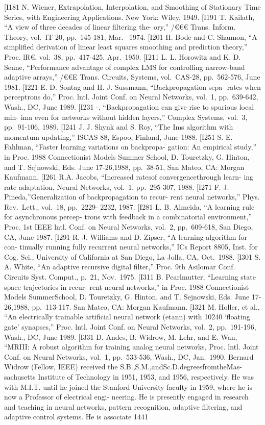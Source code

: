 {[}I181 N. Wiener, Extrapolation, Interpolation, and Smoothing of
Stationary Time Series, with Engineering Applications. New York: Wiley,
1949. {[}I191 T. Kailath, ``A view of three decades of linear filtering
the- ory,'' /€€€ Trans. Inform. Theory, vol.~IT-20, pp.~145-181, Mar.~
1974. {[}I201 H. Bode and C. Shannon, ``A simplified derivation of
linear least squares smoothing and prediction theory,'' Proc. lR€,
vol.~38, pp.~417-425, Apr.~1950. {[}I211 L. L. Horowitz and K. D. Senne,
``Performance advantage of complex LMS for controlling narrow-band
adaptive arrays,'' /€€E Trans. Circuits, Systems, vol.~CAS-28,
pp.~562-576, June 1981. {[}I221 E. D. Sontag and H. J. Sussmann,
``Backpropagation sepa- rates when perceptrons do,'' Proc. lntl. Joint
Conf. on Neural Networks, vol.~1, pp.~639-642, Wash., DC, June 1989.
{[}I231 -, ``Backpropagation can give rise to spurious local min- ima
even for networks without hidden layers,'' Complex Systems, vol.~3,
pp.~91-106, 1989. {[}I241 J. J. Shynk and S. Roy, ``The Ims algorithm
with momentum updating,'' lSCAS 88, Espoo, Finland, June 1988. {[}I251
S. E. Fahlman, ``Faster learning variations on backpropa- gation: An
empirical study,'' in Proc. 1988 Connectionist Models Summer School, D.
Touretzky, G. Hinton, and T. Sejnowski, Eds. June 17-26,1988, pp.~38-51,
San Mateo, CA: Morgan Kaufmann. {[}I261 R.A. Jacobs, ``Increased ratesof
convergencethrough learn- ing rate adaptation, Neural Networks, vol.~1,
pp.~295-307, 1988. {[}I271 F. J. Pineda,''Generalization of
backpropagation to recur- rent neural networks,'' Phys. Rev.~Lett.,
vol.~18, pp.~2229- 2232, 1987. {[}I281 L. B. Almeida, ``A learning rule
for asynchronous percep- trons with feedback in a combinatorial
environment,'' Proc. 1st IEEE lntl. Conf. on Neural Networks, vol.~2,
pp.~609-618, San Diego, CA, June 1987. {[}I291 R. J. Williams and D.
Zipser, ``A learning algorithm for con- tinually running fully recurrent
neural networks,'' ICs Report 8805, Inst. for Cog. Sci., University of
California at San Diego, La Jolla, CA, Oct.~1988. {[}I301 S. A. White,
``An adaptive recursive digital filter,'' Proc. 9th Asilomar Conf.
Circuits Syst. Comput., p.~21, Nov.~1975. {[}I311 B. Pearlmutter,
``Learning state space trajectories in recur- rent neural networks,'' in
Proc. 1988 Connectionist Models SummerSchool, D. Touretzky, G. Hinton,
and T. Sejnowski, Eds. June 17-26,1988, pp.~113-117. San Mateo, CA:
Morgan Kaufmann. {[}I321 M. Holler, et al., ``An electrically trainable
artificial neural network (etann) with 10240 `floating gate' synapses,''
Proc. lntl. Joint Conf. on Neural Networks, vol.~2, pp.~191-196, Wash.,
DC, June 1989. {[}I331 D. Andes, B. Widrow, M. Lehr, and E. Wan,
``MRIII: A robust algorithm for training analog neural networks, Proc.
lntl. Joint Conf. on Neural Networks, vol.~1, pp.~533-536, Wash., DC,
Jan.~1990. Bernard Widrow (Fellow, IEEE) received the
S.B.,S.M.,andSc.D.degreesfromtheMas- sachusetts Institute of Technology
in 1951, 1953, and 1956, respectively. He was with M.I.T. until he
joined the Stanford University faculty in 1959, where he is now a
Professor of electrical engi- neering. He is presently engaged in
research and teaching in neural networks, pattern recognition, adaptive
filtering, and adaptive control systems. He is associate 1441

